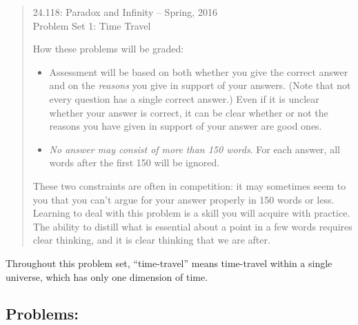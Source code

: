 \documentclass[12pt,a4paper]{article}
\begin{document}
\begin{quote}
\begin{center} {\large 24.118: Paradox and Infinity -- Spring, 2016\\ \vspace{1mm}}
 {\large Problem Set 1: Time Travel\\ \vspace{1mm}}
 
\end{center}
\vspace{3mm}

\noindent How these problems will be graded:

\begin{itemize} 

\item Assessment will be based on both whether you give the correct answer and on the \emph{reasons} you give in support of your answers. (Note that not every question has a single correct answer.) Even if it is unclear whether your answer is correct, it can be clear whether or not the reasons you have given in support of your answer are good ones. 

\item  \emph{No answer may consist of more than 150 words}. For each answer, all words after the first 150 will be ignored.


\end{itemize} 

These two constraints are often in competition: it may sometimes seem to you that you can't argue for your answer properly in 150 words or less. Learning to deal with this problem is a skill you will acquire with practice. The ability to distill what is essential about a point in a few words requires clear thinking, and it is clear thinking that we are after.

\end{quote}

Throughout this problem set, ``time-travel'' means time-travel within a single universe, which has only one dimension of time.

\subsection*{Problems:}
\end{document}
